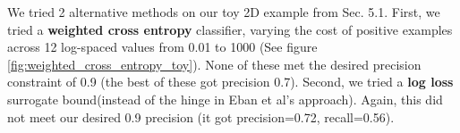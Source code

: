 We tried 2 alternative methods on our toy 2D example from Sec. 5.1. First, we tried a \textbf{weighted cross entropy} classifier, varying the cost of positive examples across 12 log-spaced values from 0.01 to 1000 (See figure \ref{fig:weighted_cross_entropy_toy}).  None of these met the desired precision constraint of 0.9 (the best of these got precision 0.7). Second, we tried a \textbf{log loss} surrogate bound(instead of the hinge in Eban et al's approach). Again, this did not meet our desired 0.9 precision (it got precision=0.72, recall=0.56).